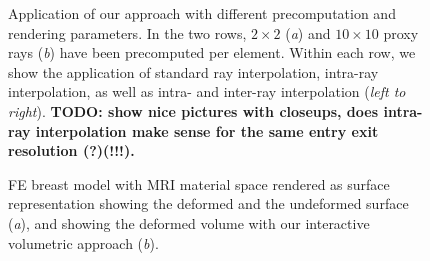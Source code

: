 \documentclass[review,journal]{vgtc}         %
\begin{document}
\begin{figure}[t]
    \caption{Application of our approach with different precomputation and rendering parameters. In the two rows, $2 \times 2$ ({\it a}) and $10 \times 10$ proxy rays ({\it b}) have been precomputed per element. Within each row, we show the application of standard ray interpolation, intra-ray interpolation, as well as intra- and inter-ray interpolation ({\it left to right}). \textbf{TODO: show nice pictures with closeups, does intra-ray interpolation make sense for the same entry exit resolution (?)(!!!).}}
    \label{fig:rayinterpolation}
\end{figure}

\begin{figure}[b]
    \centering 
    \caption{FE breast model with MRI material space rendered as surface representation showing the deformed and the undeformed surface ({\it a}), and showing the deformed volume with our interactive volumetric approach ({\it b}).}
    \label{fig:breast}
\end{figure}
\end{document}
